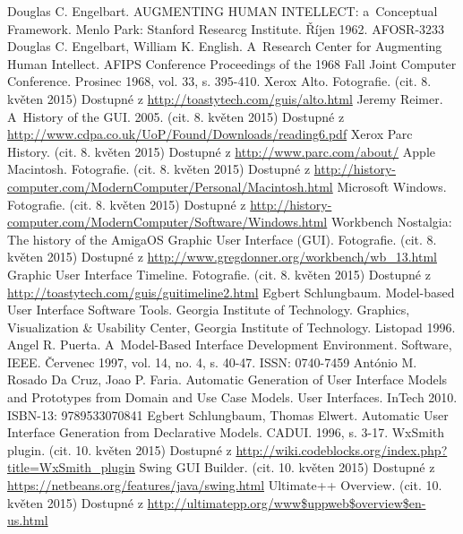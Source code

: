 \documentclass[11pt,twoside,a4paper]{book}
\begin{document}
\begin{thebibliography}{99}
 Douglas C. Engelbart. AUGMENTING HUMAN INTELLECT: a~Conceptual Framework. Menlo Park: Stanford Researcg Institute. Říjen 1962. AFOSR-3233
 Douglas C. Engelbart, William K. English. A~Research Center for Augmenting Human Intellect. AFIPS Conference Proceedings of the 1968 Fall Joint Computer Conference. Prosinec 1968, vol. 33, s. 395-410.
 Xerox Alto. Fotografie. (cit. 8. květen 2015) Dostupné z \url{http://toastytech.com/guis/alto.html}
 Jeremy Reimer. A~History of the GUI. 2005. (cit. 8. květen 2015) Dostupné z \url{http://www.cdpa.co.uk/UoP/Found/Downloads/reading6.pdf} 
  Xerox Parc History. (cit. 8. květen 2015) Dostupné z \url{http://www.parc.com/about/}
 Apple Macintosh. Fotografie. (cit. 8. květen 2015) Dostupné z \url{http://history-computer.com/ModernComputer/Personal/Macintosh.html} 
 Microsoft Windows. Fotografie. (cit. 8. květen 2015) Dostupné z \url{http://history-computer.com/ModernComputer/Software/Windows.html} 
 Workbench Nostalgia: The history of the AmigaOS Graphic User Interface (GUI). Fotografie. (cit. 8. květen 2015) Dostupné z \url{http://www.gregdonner.org/workbench/wb_13.html} 
 Graphic User Interface Timeline. Fotografie. (cit. 8. květen 2015) Dostupné z \url{http://toastytech.com/guis/guitimeline2.html} 
 Egbert Schlungbaum. Model-based User Interface Software Tools. Georgia Institute of Technology. Graphics, Visualization \& Usability Center, Georgia Institute of Technology. Listopad 1996.
 Angel R. Puerta. A~Model-Based Interface Development Environment. Software, IEEE. Červenec 1997, vol. 14, no. 4, s. 40-47. ISSN: 0740-7459
 António M. Rosado Da Cruz, Joao P. Faria. Automatic Generation of User Interface Models and Prototypes from Domain and Use Case Models. User Interfaces. InTech 2010. ISBN-13: 9789533070841
 Egbert Schlungbaum, Thomas Elwert. Automatic User Interface Generation from Declarative Models. CADUI. 1996, s. 3-17.
 WxSmith plugin. (cit. 10. květen 2015) Dostupné z \url{http://wiki.codeblocks.org/index.php?title=WxSmith_plugin} 
 Swing GUI Builder. (cit. 10. květen 2015) Dostupné z \url{https://netbeans.org/features/java/swing.html} 
 Ultimate++ Overview. (cit. 10. květen 2015) Dostupné z \url{http://ultimatepp.org/www$uppweb$overview$en-us.html} 

\end{thebibliography}
\end{document}
